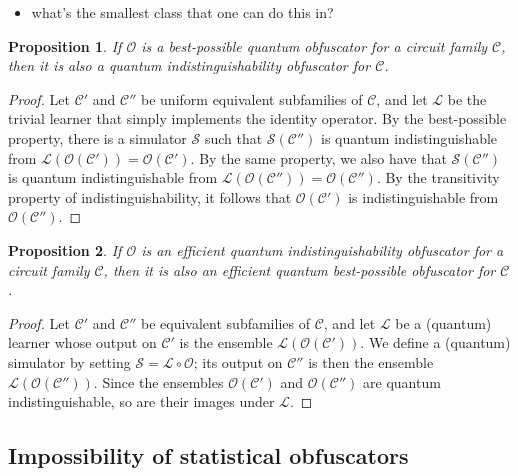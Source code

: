 \documentclass[11pt]{article}
\numberwithin{equation}{section}
\newtheorem{proposition}{Proposition}
\begin{document}
{\begin{itemize}
\item what's the smallest class that one can do this in?
\end{itemize}

\begin{proposition} If $\mathcal O$ is a best-possible quantum obfuscator for a circuit family $\mathcal C$, then it is also a quantum indistinguishability obfuscator for $\mathcal C$.
\end{proposition}
\begin{proof}
Let $\mathcal C'$ and $\mathcal C''$ be uniform equivalent subfamilies of $\mathcal C$, and let $\mathcal L$ be the trivial learner that simply implements the identity operator. By the best-possible property, there is a simulator $\mathcal S$ such that $\mathcal S(\mathcal C'')$ is quantum indistinguishable from $\mathcal L ( \mathcal O( \mathcal C')) = \mathcal O ( \mathcal C')$. By the same property, we also have that $\mathcal S(\mathcal C'')$ is quantum indistinguishable from $\mathcal L(\mathcal O (\mathcal C'')) = \mathcal O( \mathcal C'')$. By the transitivity property of indistinguishability, it follows that $\mathcal O(\mathcal C')$ is indistinguishable from $\mathcal O(\mathcal C'')$.
\end{proof}

\begin{proposition} If $\mathcal O$ is an efficient quantum indistinguishability obfuscator for a circuit family $\mathcal C$, then it is also an efficient quantum best-possible obfuscator for $\mathcal C$.
\end{proposition}
\begin{proof}
Let $\mathcal C'$ and $\mathcal C''$ be equivalent subfamilies of $\mathcal C$, and let $\mathcal L$ be a (quantum) learner whose output on $\mathcal C'$ is the ensemble $\mathcal L(\mathcal O (\mathcal C'))$. We define a (quantum) simulator by setting $\mathcal S = \mathcal L \circ \mathcal O$; its output on $\mathcal C''$ is then the ensemble $\mathcal L(\mathcal O(\mathcal C''))$. Since the ensembles $\mathcal O(\mathcal C')$ and $\mathcal O(\mathcal C'')$ are quantum indistinguishable, so are their images under $\mathcal L$.
\end{proof}
\subsection{Impossibility of statistical obfuscators}

}
\end{document}

